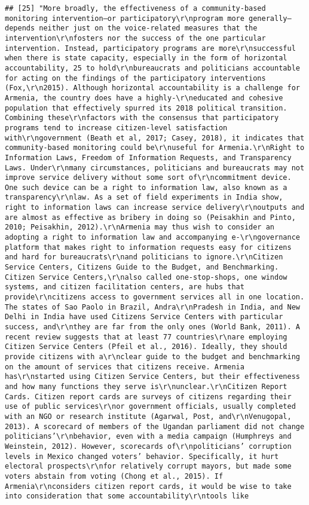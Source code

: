 \documentclass[
]{article}
\begin{document}
\begin{verbatim}
## [25] "More broadly, the effectiveness of a community-based monitoring intervention—or participatory\r\nprogram more generally—depends neither just on the voice-related measures that the intervention\r\nfosters nor the success of the one particular intervention. Instead, participatory programs are more\r\nsuccessful when there is state capacity, especially in the form of horizontal accountability, 25 to hold\r\nbureaucrats and politicians accountable for acting on the findings of the participatory interventions (Fox,\r\n2015). Although horizontal accountability is a challenge for Armenia, the country does have a highly-\r\neducated and cohesive population that effectively spurred its 2018 political transition. Combining these\r\nfactors with the consensus that participatory programs tend to increase citizen-level satisfaction with\r\ngovernment (Beath et al, 2017; Casey, 2018), it indicates that community-based monitoring could be\r\nuseful for Armenia.\r\nRight to Information Laws, Freedom of Information Requests, and Transparency Laws. Under\r\nmany circumstances, politicians and bureaucrats may not improve service delivery without some sort of\r\ncommitment device. One such device can be a right to information law, also known as a transparency\r\nlaw. As a set of field experiments in India show, right to information laws can increase service delivery\r\noutputs and are almost as effective as bribery in doing so (Peisakhin and Pinto, 2010; Peisakhin, 2012).\r\nArmenia may thus wish to consider an adopting a right to information law and accompanying e-\r\ngovernance platform that makes right to information requests easy for citizens and hard for bureaucrats\r\nand politicians to ignore.\r\nCitizen Service Centers, Citizens Guide to the Budget, and Benchmarking. Citizen Service Centers,\r\nalso called one-stop-shops, one window systems, and citizen facilitation centers, are hubs that provide\r\ncitizens access to government services all in one location. The states of Sao Paolo in Brazil, Andra\r\nPradesh in India, and New Delhi in India have used Citizens Service Centers with particular success, and\r\nthey are far from the only ones (World Bank, 2011). A recent review suggests that at least 77 countries\r\nare employing Citizen Service Centers (Pfeil et al., 2016). Ideally, they should provide citizens with a\r\nclear guide to the budget and benchmarking on the amount of services that citizens receive. Armenia has\r\nstarted using Citizen Service Centers, but their effectiveness and how many functions they serve is\r\nunclear.\r\nCitizen Report Cards. Citizen report cards are surveys of citizens regarding their use of public services\r\nor government officials, usually completed with an NGO or research institute (Agarwal, Post, and\r\nVenugopal, 2013). A scorecard of members of the Ugandan parliament did not change politicians’\r\nbehavior, even with a media campaign (Humphreys and Weinstein, 2012). However, scorecards of\r\npoliticians’ corruption levels in Mexico changed voters’ behavior. Specifically, it hurt electoral prospects\r\nfor relatively corrupt mayors, but made some voters abstain from voting (Chong et al., 2015). If Armenia\r\nconsiders citizen report cards, it would be wise to take into consideration that some accountability\r\ntools like 
\end{verbatim}
\end{document}
